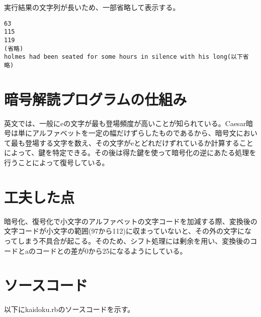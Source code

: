 \documentclass{jsarticle}
\begin{document}
実行結果の文字列が長いため、一部省略して表示する。

\begin{lstlisting}
63
115
119
(省略)
holmes had been seated for some hours in silence with his long(以下省略)
\end{lstlisting}

\section{暗号解読プログラムの仕組み}

英文では、一般にeの文字が最も登場頻度が高いことが知られている。Caesar暗号は単にアルファベットを一定の幅だけずらしたものであるから、暗号文において最も登場する文字を数え、その文字がeとどれだけずれているか計算することによって、鍵を特定できる。その後は得た鍵を使って暗号化の逆にあたる処理を行うことによって復号している。

\section{工夫した点}

暗号化、復号化で小文字のアルファベットの文字コードを加減する際、変換後の文字コードが小文字の範囲(97から112)に収まっていないと、その外の文字になってしまう不具合が起こる。そのため、シフト処理には剰余を用い、変換後のコードとaのコードとの差が0から25になるようにしている。

\section{ソースコード}

以下にkaidoku.rbのソースコードを示す。
\end{document}
